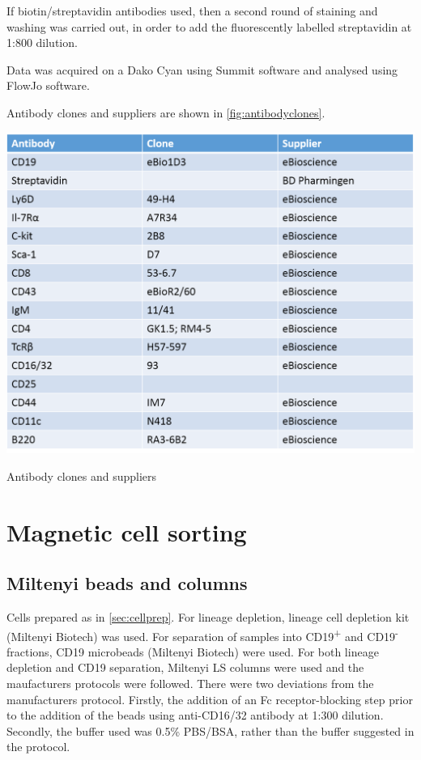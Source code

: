 If biotin/streptavidin antibodies used, then a second round of staining and washing was carried out, in order to add the fluorescently labelled streptavidin at 1:800 dilution.

Data was acquired on a Dako Cyan using Summit software and analysed using FlowJo software.

Antibody clones and suppliers are shown in \cref{fig:antibodyclones}. 

\begin{table}
\includegraphics[width=\textwidth]{Figures/Antibodyclones.png}
\caption{Antibody clones and suppliers}
\label{fig:antibodyclones}
\end{table}

\section{Magnetic cell sorting}
\label{Methods:MACSdepletion}

\subsection{Miltenyi beads and columns}
\label{subsec:Miltenyibeads}

Cells prepared as in \cref{sec:cellprep}.
For lineage depletion, lineage cell depletion kit (Miltenyi Biotech) was used.
For separation of samples into CD19\textsuperscript{+} and CD19\textsuperscript{-} fractions, CD19 microbeads (Miltenyi Biotech) were used.
For both lineage depletion and CD19 separation, Miltenyi LS columns were used and the maufacturers protocols were followed.
There were two deviations from the manufacturers protocol.
Firstly, the addition of an Fc receptor-blocking step prior to the addition of the beads using anti-CD16/32 antibody at 1:300 dilution.
Secondly, the buffer used was 0.5\% PBS/BSA, rather than the buffer suggested in the protocol.

